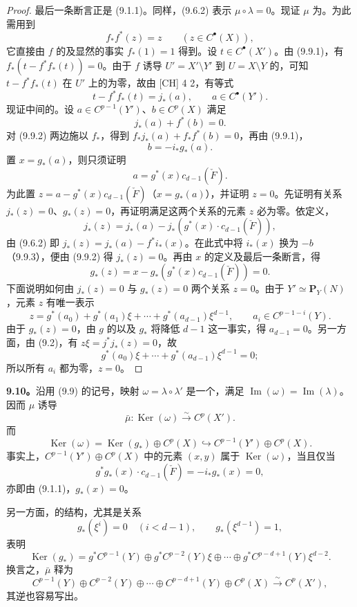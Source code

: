 \begin{proof}
最后一条断言正是 (9.1.1)。同样，(9.6.2) 表示 $\mu\circ\lambda=0$。现证 $\mu$ 为。为此需用到
\[
 f_*f^*(z)=z\qquad(z\in C^\bullet(X)),\tag{9.9.1}
\]
它直接由 $f$ 的及显然的事实 $f_*(1)=1$ 得到。设 $t\in C^\bullet(X')$。由 (9.9.1)，有 $f_*(t-f^*f_*(t))=0$。由于 $f$ 诱导 $U'=X'\setminus Y'$ 到 $U=X\setminus Y$ 的，可知
$t-f^*f_*(t)$ 在 $U'$ 上的为零，故由 [CH] 4  2，有等式
\[
 t-f^*f_*(t)=j_*(a),\qquad a\in C^\bullet(Y').
\]
现证中间的。设 $a\in C^{p-1}(Y')$、$b\in C^p(X)$ 满足
\[
 j_*(a)+f^*(b)=0.\tag{9.9.2}
\]
对 (9.9.2) 两边施以 $f_*$，得到 $f_*j_*(a)+f_*f^*(b)=0$，再由 (9.9.1)，
\[
 b=-i_*g_*(a).\tag{9.9.3}
\]
置 $x=g_*(a)$，则只须证明
\[
 a=g^*(x)c_{d-1}(\check F).\tag{9.9.4}
\]
为此置 $z=a-g^*(x)c_{d-1}(\check F)$（$x=g_*(a)$），并证明 $z=0$。先证明有关系 $j_*(z)=0$、$g_*(z)=0$，再证明满足这两个关系的元素 $z$ 必为零。依定义，
\[
 j_*(z)=j_*(a)-j_*(g^*(x)\cdot c_{d-1}(\check F)),
\]
由 (9.6.2) 即 $j_*(z)=j_*(a)-f^*i_*(x)$。在此式中将 $i_*(x)$ 换为 $-b$（9.9.3），便由 (9.9.2) 得 $j_*(z)=0$。再由 $x$ 的定义及最后一条断言，得
\[
 g_*(z)=x-g_*(g^*(x)c_{d-1}(\check F))=0.
\]
下面说明如何由 $j_*(z)=0$ 与 $g_*(z)=0$ 两个关系
$z=0$。由于 $Y'\simeq\mathbf P_Y(N)$，元素 $z$ 有唯一表示
\[
 z=g^*(a_0)+g^*(a_1)\xi+\cdots+g^*(a_{d-1})\xi^{d-1},
 \qquad a_i\in C^{p-1-i}(Y).
\]
由于 $g_*(z)=0$，由 $g$ 的以及 $g_*$ 将降低 $d-1$ 这一事实，得 $a_{d-1}=0$。另一方面，由 (9.2)，有 $z\xi=j^*j_*(z)=0$，故
\[
 g^*(a_0)\xi+\cdots+g^*(a_{d-1})\xi^{d-1}=0;
\]
所以所有 $a_i$ 都为零，$z=0$。
\end{proof}
\textbf{9.10。}沿用 (9.9) 的记号，映射 $\omega=\lambda\circ\lambda'$ 是一个，满足 $\operatorname{Im}(\omega)=\operatorname{Im}(\lambda)$。因而 $\mu$ 诱导
\[
 \bar\mu:\operatorname{Ker}(\omega)\xrightarrow{\sim}C^p(X').
\]
而
\[
 \operatorname{Ker}(\omega)=\operatorname{Ker}(g_*)\oplus C^p(X)
 \hookrightarrow C^{p-1}(Y')\oplus C^p(X).\tag{9.10.1}
\]
事实上，$C^{p-1}(Y')\oplus C^p(X)$ 中的元素 $(x,y)$ 属于 $\operatorname{Ker}(\omega)$，当且仅当
\[
 g^*g_*(x)\cdot c_{d-1}(\check F)=-i_*g_*(x)=0,
\]
亦即由 (9.1.1)，$g_*(x)=0$。

另一方面，的结构，尤其是关系
\[
 g_*(\xi^i)=0\quad(i<d-1),\qquad g_*(\xi^{d-1})=1,
\]
表明
\[
 \operatorname{Ker}(g_*)=g^*C^{p-1}(Y)\oplus g^*C^{p-2}(Y)\xi\oplus\cdots\oplus g^*C^{p-d+1}(Y)\xi^{d-2}.
\]
换言之，$\bar\mu$ 释为
\[
 C^{p-1}(Y)\oplus C^{p-2}(Y)\oplus\cdots\oplus C^{p-d+1}(Y)\oplus C^p(X)
 \xrightarrow{\sim}C^p(X'),\tag{9.10.2}
\]
其逆也容易写出。

